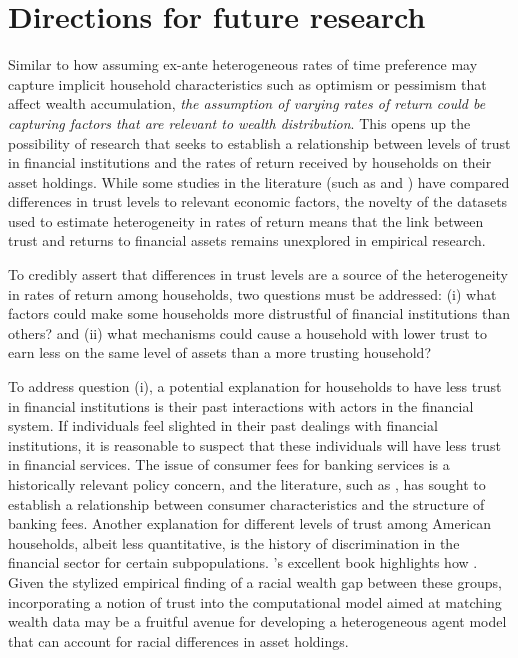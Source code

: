 \documentclass[\econtexRoot/PreproposalFinal]{subfiles}
\begin{document}
\hypertarget{Conclusion}{}
\section{Directions for future research}\notinsubfile{\label{sec:conclusion}}


\par Similar to how assuming ex-ante heterogeneous rates of time preference may capture implicit household characteristics such as optimism or pessimism that affect wealth accumulation, \textit{the assumption of varying rates of return could be capturing factors that are relevant to wealth distribution}. This opens up the possibility of research that seeks to establish a relationship between levels of trust in financial institutions and the rates of return received by households on their asset holdings. While some studies in the literature (such as \cite{lgpslz2008} and \cite{jbpglg2016}) have compared differences in trust levels to relevant economic factors, the novelty of the datasets used to estimate heterogeneity in rates of return means that the link between trust and returns to financial assets remains unexplored in empirical research.

\par To credibly assert that differences in trust levels are a source of the heterogeneity in rates of return among households, two questions must be addressed: (i) what factors could make some households more distrustful of financial institutions than others? and (ii) what mechanisms could cause a household with lower trust to earn less on the same level of assets than a more trusting household?

\par To address question (i), a potential explanation for households to have less trust in financial institutions is their past interactions with actors in the financial system. If individuals feel slighted in their past dealings with financial institutions, it is reasonable to suspect that these individuals will have less trust in financial services. The issue of consumer fees for banking services is a historically relevant policy concern, and the literature, such as \cite{roberta2017}, has sought to establish a relationship between consumer characteristics and the structure of banking fees. Another explanation for different levels of trust among American households, albeit less quantitative, is the history of discrimination in the financial sector for certain subpopulations. \cite{mehrab2017}'s excellent book highlights how . Given the stylized empirical finding of a racial wealth gap between these groups, incorporating a notion of trust into the computational model aimed at matching wealth data may be a fruitful avenue for developing a heterogeneous agent model that can account for racial differences in asset holdings. 
\end{document}
